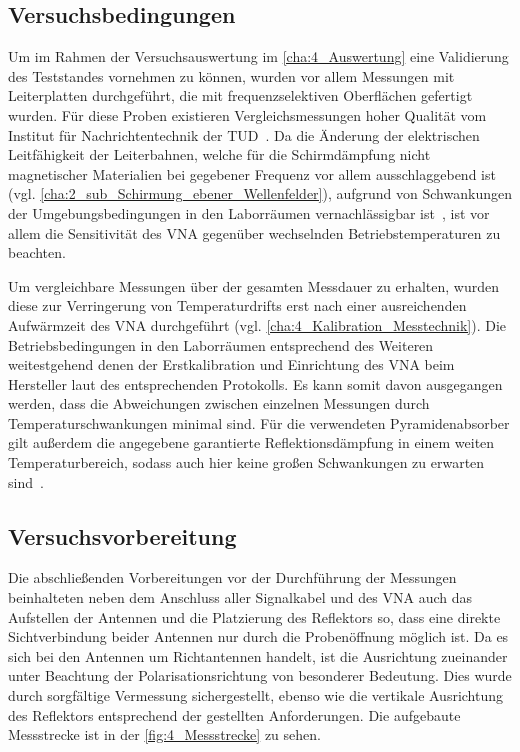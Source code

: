 

\subsection{Versuchsbedingungen}

Um im Rahmen der Versuchsauswertung im \Abschnitt\ref{cha:4_Auswertung} eine Validierung des Teststandes vornehmen zu können, wurden vor allem Messungen mit Leiterplatten durchgeführt, die mit frequenzselektiven Oberflächen gefertigt wurden. Für diese Proben existieren Vergleichsmessungen hoher Qualität vom Institut für Nachrichtentechnik der TUD~\cite{FSS_Toedter_Diplomarbeit}. Da die Änderung der elektrischen Leitfähigkeit der Leiterbahnen, welche für die Schirmdämpfung nicht magnetischer Materialien bei gegebener Frequenz vor allem ausschlaggebend ist (vgl. \Abschnitt\ref{cha:2_sub_Schirmung_ebener_Wellenfelder}), aufgrund von Schwankungen der Umgebungsbedingungen in den Laborräumen vernachlässigbar ist~\cite{Materialdaten_Kupfer}, ist vor allem die Sensitivität des VNA gegenüber wechselnden Betriebstemperaturen zu beachten.
\par
\vspace{\linespace}
Um vergleichbare Messungen über der gesamten Messdauer zu erhalten, wurden diese zur Verringerung von Temperaturdrifts erst nach einer ausreichenden Aufwärmzeit des VNA durchgeführt (vgl. \Abschnitt\ref{cha:4_Kalibration_Messtechnik}). Die Betriebsbedingungen in den Laborräumen entsprechend des Weiteren weitestgehend denen der Erstkalibration und Einrichtung des VNA beim Hersteller laut des entsprechenden Protokolls. Es kann somit davon ausgegangen werden, dass die Abweichungen zwischen einzelnen Messungen durch Temperaturschwankungen minimal sind. Für die verwendeten Pyramidenabsorber gilt außerdem die angegebene garantierte Reflektionsdämpfung in einem weiten Temperaturbereich, sodass auch hier keine großen Schwankungen zu erwarten sind~\cite{Eco_Messtechnik_Absorber}.



\subsection{Versuchsvorbereitung}

Die abschließenden Vorbereitungen vor der Durchführung der Messungen beinhalteten neben dem Anschluss aller Signalkabel und des VNA auch das Aufstellen der Antennen und die Platzierung des Reflektors so, dass eine direkte Sichtverbindung beider Antennen nur durch die Probenöffnung möglich ist. Da es sich bei den Antennen um Richtantennen handelt, ist die Ausrichtung zueinander unter Beachtung der Polarisationsrichtung von besonderer Bedeutung. Dies wurde durch sorgfältige Vermessung sichergestellt, ebenso wie die vertikale Ausrichtung des Reflektors entsprechend der gestellten Anforderungen. Die aufgebaute Messstrecke ist in der \Abb\ref{fig:4_Messstrecke} zu sehen.
\par
\vspace{\linespace}


